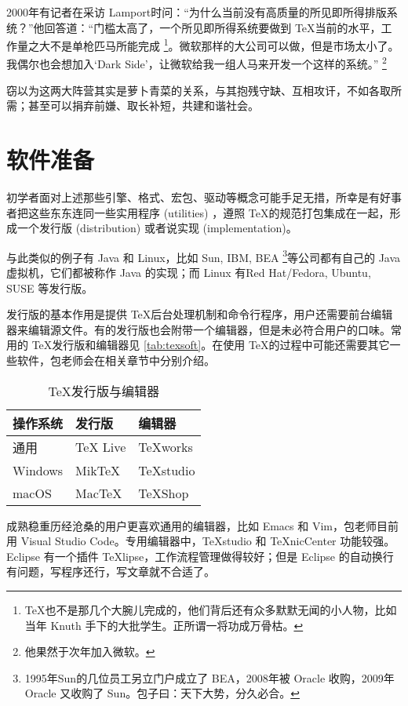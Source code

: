 2000年有记者在采访 Lamport\indexLamport{}时问：“为什么当前没有高质量的所见即所得排版系统？”他回答道：“门槛太高了，一个所见即所得系统要做到 \TeX 当前的水平，工作量之大不是单枪匹马所能完成 \footnote{\TeX 也不是那几个大腕儿完成的，他们背后还有众多默默无闻的小人物，比如当年 Knuth 手下的大批学生。正所谓一将功成万骨枯。}。微软那样的大公司可以做，但是市场太小了。我偶尔也会想加入‘Dark Side’，让微软给我一组人马来开发一个这样的系统。” \footnote{他果然于次年加入微软。}

窃以为这两大阵营其实是萝卜青菜的关系，与其抱残守缺、互相攻讦，不如各取所需；甚至可以捐弃前嫌、取长补短，共建和谐社会。

\section{软件准备}

初学者面对上述那些引擎、格式、宏包、驱动等概念可能手足无措，所幸是有好事者把这些东东连同一些实用程序 (utilities) ，遵照 \TeX 的规范打包集成在一起，形成一个发行版 (distribution) 或者说实现 (implementation)。

与此类似的例子有 Java 和 Linux，比如 Sun, IBM, BEA \footnote{1995年Sun的几位员工另立门户成立了 BEA，2008年被 Oracle 收购，2009年 Oracle 又收购了 Sun。包子曰：天下大势，分久必合。}等公司都有自己的 Java 虚拟机，它们都被称作 Java 的实现；而 Linux 有Red Hat/Fedora, Ubuntu, SUSE 等发行版。

发行版的基本作用是提供 \TeX 后台处理机制和命令行程序，用户还需要前台编辑器来编辑源文件。有的发行版也会附带一个编辑器，但是未必符合用户的口味。常用的 \TeX 发行版和编辑器见 \autoref{tab:texsoft}。在使用 \TeX 的过程中可能还需要其它一些软件，包老师会在相关章节中分别介绍。

\begin{table}[htbp]
\caption{\TeX 发行版与编辑器}
\label{tab:texsoft}
\centering
\begin{tabular}{lll}
   \toprule
    操作系统 & 发行版 & 编辑器 \\
   \midrule
    通用        & TeX Live  & TeXworks \\
    Windows     & MikTeX    & TeXstudio \\
    macOS       & MacTeX    & TeXShop \\

   \bottomrule
\end{tabular}
\end{table}

成熟稳重历经沧桑的用户更喜欢通用的编辑器，比如 Emacs 和 Vim，包老师目前用 Visual Studio Code。专用编辑器中，TeXstudio 和 TeXnicCenter 功能较强。Eclipse 有一个插件 TeXlipse，工作流程管理做得较好；但是 Eclipse 的自动换行有问题，写程序还行，写文章就不合适了。

